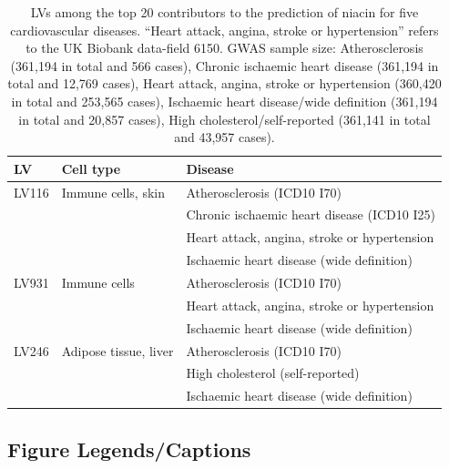 \documentclass[
  a4paper,
]{article}
\begin{document}
\begin{table}[h]
\caption{LVs among the top 20 contributors to the prediction of niacin for five cardiovascular diseases. ``Heart attack, angina, stroke or hypertension'' refers to the UK Biobank data-field 6150. GWAS sample size: Atherosclerosis (361,194 in total and 566 cases), Chronic ischaemic heart disease (361,194 in total and 12,769 cases), Heart attack, angina, stroke or hypertension (360,420 in total and 253,565 cases), Ischaemic heart disease/wide definition (361,194 in total and 20,857 cases), High cholesterol/self-reported (361,141 in total and 43,957 cases). \label{tbl:niacin:cardio:top_lvs}}\label{tbl:niacin:cardio:top_lvs}%
\centering
\begin{tabular}{lll}
\toprule
LV & Cell type & Disease \\
\midrule
LV116 & Immune cells, skin & Atherosclerosis (ICD10 I70) \\
& & Chronic ischaemic heart disease (ICD10 I25) \\
& & Heart attack, angina, stroke or hypertension \\
& & Ischaemic heart disease (wide definition) \\
LV931 & Immune cells & Atherosclerosis (ICD10 I70) \\
& & Heart attack, angina, stroke or hypertension \\
& & Ischaemic heart disease (wide definition) \\
LV246 & Adipose tissue, liver & Atherosclerosis (ICD10 I70) \\
& & High cholesterol (self-reported) \\
& & Ischaemic heart disease (wide definition) \\
\bottomrule
\end{tabular}
\end{table}

\clearpage

\hypertarget{figurecaptions}{%
\subsection{Figure Legends/Captions}\label{figurecaptions}}
\end{document}
